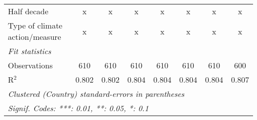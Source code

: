 \begin{tabular}{lccccccc}
   Half decade                                                                      & x              & x              & x              & x              & x              & x              & x\\  
   Type of climate action/measure                                                   & x              & x              & x              & x              & x              & x              & x\\  
   \midrule \emph{Fit statistics}\\
   Observations                                                                     & 610            & 610            & 610            & 610            & 610            & 610            & 600\\  
   R$^2$                                                                            & 0.802          & 0.802          & 0.804          & 0.804          & 0.804          & 0.804          & 0.807\\  
   \midrule
   \multicolumn{8}{l}{\emph{Clustered (Country) standard-errors in parentheses}}\\
   \multicolumn{8}{l}{\emph{Signif. Codes: ***: 0.01, **: 0.05, *: 0.1}}\\
\end{tabular}
\par\endgroup


